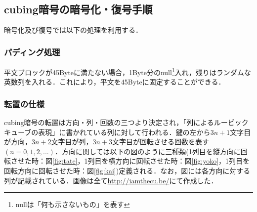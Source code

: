 \documentclass[a4j,titlepage]{jsarticle}
\begin{document}
\subsection{cubing暗号の暗号化・復号手順}
暗号化及び復号では以下の処理を利用する．

\subsubsection{パディング処理}
平文ブロックが45Byteに満たない場合，1Byte分のnull\footnote{nullは「何も示さないもの」を表す}入れ，残りはランダムな英数列を入れる．これにより，平文を45Byteに固定することができる．

\subsubsection{転置の仕様}
cubing暗号の転置は方向・列・回数の三つより決定され，「列によるルービックキューブの表現」に書かれている列に対して行われる．鍵の左から\(3n+1\)文字目が方向，\(3n+2\)文字目が列，\(3n+3\)文字目が回転させる回数を表す\((n=0,1,2,...)\)．方向に関しては以下の図のように三種類(1列目を縦方向に回転させた時：図\ref{fig:tate}，1列目を横方向に回転させた時：図\ref{fig:yoko}，1列目を回転方向に回転させた時：図\ref{fig:kai})定義される．なお，図には各方向に対する列が記載されている．画像は全て\url{http://iamthecu.be/}にて作成した．
\end{document}
